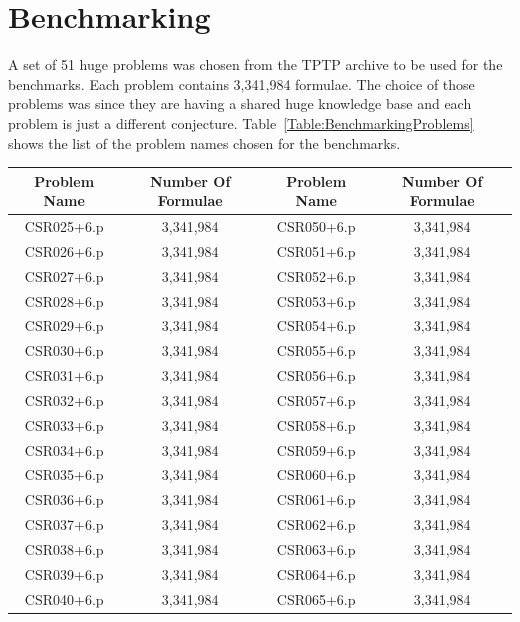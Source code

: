 \chapter{Benchmarking}

A set of 51 huge problems was chosen from the TPTP archive to be used for the benchmarks. Each problem contains 3,341,984 formulae. The choice of those problems was since they are having a shared huge knowledge base and each problem is just a different conjecture. Table~\ref{Table:BenchmarkingProblems} shows the list of the problem names chosen for the benchmarks.
\begin{table}[ht]
  \begin{center}
    \begin{tabular}{c|c||c|c}
      \toprule
      Problem Name & Number Of Formulae & Problem Name & Number Of Formulae \\
      \midrule
      CSR025+6.p   & 3,341,984          & CSR050+6.p   & 3,341,984 \\
      CSR026+6.p   & 3,341,984          & CSR051+6.p   & 3,341,984 \\
      CSR027+6.p   & 3,341,984          & CSR052+6.p   & 3,341,984 \\
      CSR028+6.p   & 3,341,984          & CSR053+6.p   & 3,341,984 \\
      CSR029+6.p   & 3,341,984          & CSR054+6.p   & 3,341,984 \\
      CSR030+6.p   & 3,341,984          & CSR055+6.p   & 3,341,984 \\
      CSR031+6.p   & 3,341,984          & CSR056+6.p   & 3,341,984 \\
      CSR032+6.p   & 3,341,984          & CSR057+6.p   & 3,341,984 \\
      CSR033+6.p   & 3,341,984          & CSR058+6.p   & 3,341,984 \\
      CSR034+6.p   & 3,341,984          & CSR059+6.p   & 3,341,984 \\
      CSR035+6.p   & 3,341,984          & CSR060+6.p   & 3,341,984 \\
      CSR036+6.p   & 3,341,984          & CSR061+6.p   & 3,341,984 \\
      CSR037+6.p   & 3,341,984          & CSR062+6.p   & 3,341,984 \\
      CSR038+6.p   & 3,341,984          & CSR063+6.p   & 3,341,984 \\
      CSR039+6.p   & 3,341,984          & CSR064+6.p   & 3,341,984 \\
      CSR040+6.p   & 3,341,984          & CSR065+6.p   & 3,341,984 \\

\end{tabular}
\end{center}
\end{table}
